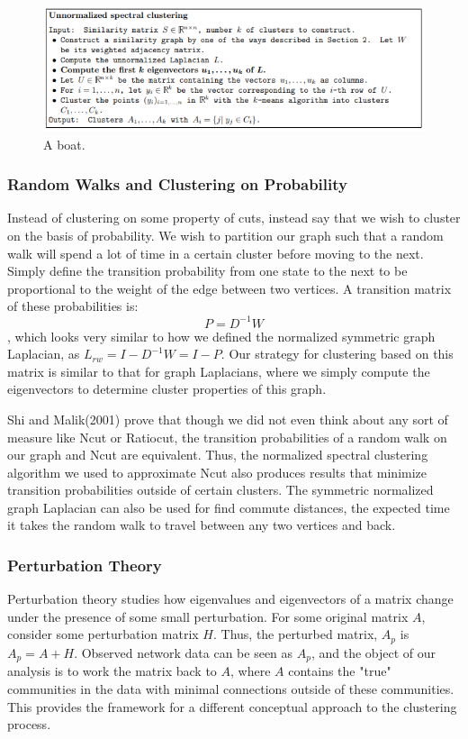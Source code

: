 \documentclass{article}
\begin{document}
\begin{figure}
  \includegraphics[width=\linewidth]{unnormsc.PNG}
  \caption{A boat.}
  \label{fig:boat1}
\end{figure}

\subsubsection{Random Walks and Clustering on Probability}

Instead of clustering on some property of cuts, instead say that we wish to cluster on the basis of probability. We wish to partition our graph such that a random walk will spend a lot of time in a certain cluster before moving to the next. Simply define the transition probability from one state to the next to be proportional to the weight of the edge between two vertices. A transition matrix of these probabilities is: $$P = D^{-1}W$$, which looks very similar to how we defined the normalized symmetric graph Laplacian, as $L_{rw} = I - D^{-1}W = I -P$. Our strategy for clustering based on this matrix is similar to that for graph Laplacians, where we simply compute the eigenvectors to determine cluster properties of this graph. 

Shi and Malik(2001) prove that though we did not even think about any sort of measure like Ncut or Ratiocut, the transition probabilities of a random walk on our graph and Ncut are equivalent. Thus, the normalized spectral clustering algorithm we used to approximate Ncut also produces results that minimize transition probabilities outside of certain clusters. The symmetric normalized graph Laplacian can also be used for find commute distances, the expected time it takes the random walk to travel between any two vertices and back.

\subsubsection{Perturbation Theory}

Perturbation theory studies how eigenvalues and eigenvectors of a matrix change under the presence of some small perturbation. For some original matrix $A$, consider some perturbation matrix $H$. Thus, the perturbed matrix, $A_p$ is $A_p = A + H$.  Observed network data can be seen as $A_p$, and the object of our analysis is to work the matrix back to $A$, where $A$ contains the "true" communities in the data with minimal connections outside of these communities. This provides the framework for a different conceptual approach to the clustering process.


            
\end{document}
